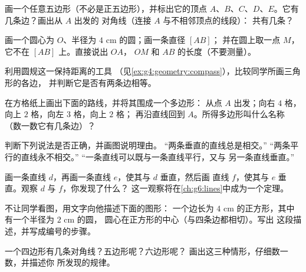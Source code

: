 \begin{exercise}[$\star$]\label{exo:g4:geometry:4}
画一个任意五边形（不必是正五边形），并标出它的顶点
$A$、$B$、$C$、$D$、$E$。它有几条边？画出从 $A$ 出发的
对角线（连接 $A$ 与不相邻顶点的线段）：
共有几条？
\end{exercise}

\begin{exercise}[$\star$]\label{exo:g4:geometry:5}
画一个圆心为 $O$、半径为 $4$ cm 的圆；画一条直径 $[AB]$；
并在圆上取一点 $M$，它不在 $[AB]$ 上。直接说出 $OA$，
$OM$ 和 $AB$ 的长度（不要测量）。
\end{exercise}

\begin{exercise}[$\star$]\label{exo:g4:geometry:6}
利用圆规这一保持距离的工具
（见\cref{ex:g4:geometry:compass}），比较同学所画三角形的各边，
并判断它是否有两条边相等。
\end{exercise}

\begin{exercise}[$\star$]\label{exo:g4:geometry:7}
在方格纸上画出下面的路线，并将其围成一个多边形：
从点 $A$ 出发；向右 $4$ 格，向上 $2$ 格，向左 $3$ 格，向上 $2$ 格；
再沿直线回到 $A$。所得多边形叫什么名称
（数一数它有几条边）？
\end{exercise}

\begin{exercise}[$\star$]\label{exo:g4:geometry:8}
判断下列说法是否正确，并画图说明理由。
“两条垂直的直线总是相交。”
“两条平行的直线永不相交。”
“一条直线可以既与一条直线平行，又与
另一条直线垂直。”
\end{exercise}

\begin{exercise}[$\star\star$]\label{exo:g4:geometry:9}
画一条直线 $d$，再画一条直线 $e$，使其与 $d$ 垂直，然后画
直线 $f$，使其与 $e$ 垂直。观察 $d$ 与 $f$，你发现了什么？
这一观察将在\cref{ch:g6:lines}中成为一个定理。
\end{exercise}

\begin{exercise}[$\star\star$]\label{exo:g4:geometry:10}
不让同学看图，用文字向他描述下面的图形：
一个边长为 $4$ cm 的正方形，其中有一个半径为 $2$ cm 的圆，
圆心在正方形的中心（与四条边都相切）。写出
这段描述，并写成编号的步骤。
\end{exercise}

\begin{exercise}[$\star\star$]\label{exo:g4:geometry:11}
一个四边形有几条对角线？五边形呢？六边形呢？
画出这三种情形，仔细数一数，并描述你
所发现的规律。
\end{exercise}
